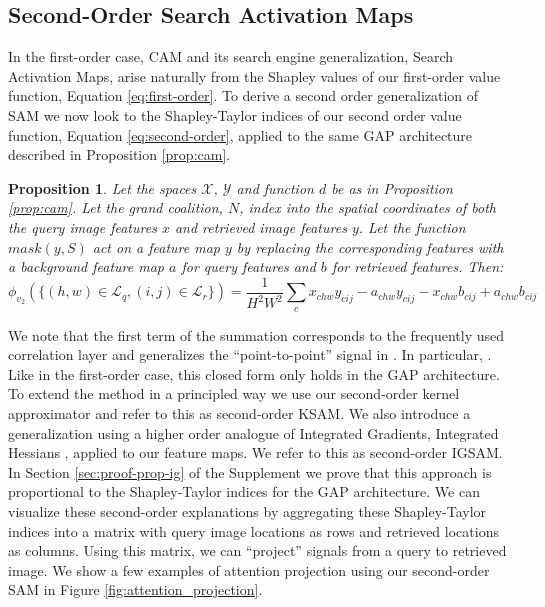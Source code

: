 \documentclass{article} %
\newtheorem{proposition}{Proposition}[section]
\begin{document}
\vspace{-.1in}
\subsection{Second-Order Search Activation Maps}
\label{sec:attn-proj}
\vspace{-.1in}

In the first-order case, CAM and its search engine generalization, Search Activation Maps, arise naturally from the Shapley values of our first-order value function, Equation \ref{eq:first-order}. To derive a second order generalization of SAM we now look to the Shapley-Taylor indices of our second order value function, Equation \ref{eq:second-order}, applied to the same GAP architecture described in Proposition \ref{prop:cam}.
\vspace{-.05in}
\begin{proposition}
\label{prop:so-cam}
 Let the spaces $\mathcal{X}$, $\mathcal{Y}$ and function $d$ be as in Proposition \ref{prop:cam}. Let the grand coalition, $N$, index into the spatial coordinates of both the query image features $x$ and retrieved image features $y$. Let the function $mask(y, S)$ act on a feature map $y$ by replacing the corresponding features with a background feature map $a$ for query features and $b$ for retrieved features. Then:
\vspace{-.05in}
\begin{equation}
    \phi_{v_2}(\{(h,w) \in \mathcal{L}_q, (i,j)\in \mathcal{L}_r\}) = \frac{1}{H^2W^2}\sum_c x_{chw}y_{cij} - a_{chw}y_{cij} - x_{chw}b_{cij} + a_{chw}b_{cij}
\end{equation}
\vspace{-.05in}
\end{proposition}
\vspace{-.1in}
We note that the first term of the summation corresponds to the frequently used correlation layer \citep{flownet,sun2020mining,wang2020learning,MaCoSNet} and generalizes the ``point-to-point'' signal in \cite{vedml}. In particular, . Like in the first-order case, this closed form only holds in the GAP architecture. To extend the method in a principled way we use our second-order kernel approximator and refer to this as second-order KSAM. We also introduce a generalization using a higher order analogue of Integrated Gradients, Integrated Hessians \citep{integrated-hessians}, applied to our feature maps. We refer to this as second-order IGSAM. In Section \ref{sec:proof-prop-ig} of the Supplement we prove that this approach is proportional to the Shapley-Taylor indices for the GAP architecture. We can visualize these second-order explanations by aggregating these Shapley-Taylor indices into a matrix with query image locations as rows and retrieved locations as columns. Using this matrix, we can ``project'' signals from a query to retrieved image. We show a few examples of attention projection using our second-order SAM in Figure \ref{fig:attention_projection}.
\end{document}
